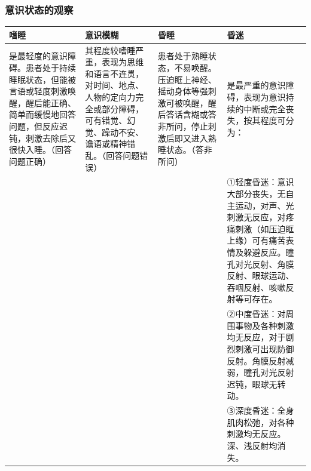 \documentclass[11pt, a4paper]{ctexart}
\begin{document}
\subsubsection{意识状态的观察}
\begin{table}[htbp]
	\centering
	\begin{tabular}{|p{2.5cm}|p{3cm}|p{3cm}|p{6cm}|}
		\hline
		\textbf{嗜睡}                                                                  & \textbf{意识模糊}                                                           & \textbf{昏睡}                                                        & \textbf{昏迷}                                                                            \\
		\hline
		是最轻度的意识障碍。患者处于持续睡眠状态，但能被言语或轻度刺激唤醒，醒后能正确、简单而缓慢地回答问题，但反应迟钝，刺激去除后又很快入睡。（回答问题正确） & 其程度较嗜睡严重，表现为思维和语言不连贯，对时间、地点、人物的定向力完全或部分障碍，可有错觉、幻觉、躁动不安、谵语或精神错乱。（回答问题错误） & 患者处于熟睡状态，不易唤醒。压迫眶上神经、摇动身体等强刺激可被唤醒，醒后答话含糊或答非所问，停止刺激后即又进入熟睡状态。（答非所问） & 是最严重的意识障碍，表现为意识持续的中断或完全丧失，按其程度可分为：                                                     \\
		                                                                             &                                                                         &                                                                    & ①轻度昏迷：意识大部分丧失，无自主运动，对声、光刺激无反应，对疼痛刺激（如压迫眶上缘）可有痛苦表情及躲避反应。瞳孔对光反射、角膜反射、眼球运动、吞咽反射、咳嗽反射等可存在。 \\
		                                                                             &                                                                         &                                                                    & ②中度昏迷：对周围事物及各种刺激均无反应，对于剧烈刺激可出现防御反射。角膜反射减弱，瞳孔对光反射迟钝，眼球无转动。                              \\
		                                                                             &                                                                         &                                                                    & ③深度昏迷：全身肌肉松弛，对各种刺激均无反应。深、浅反射均消失。                                                       \\
		\hline
	\end{tabular}
\end{table}
\end{document}
